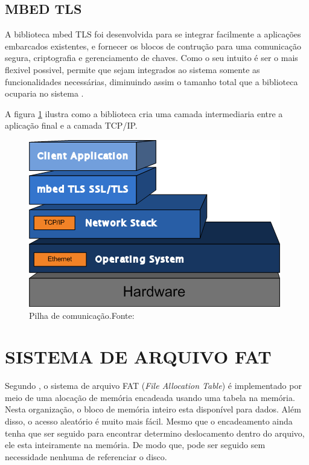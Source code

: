 \subsection{MBED TLS}
A biblioteca mbed TLS foi desenvolvida para se integrar facilmente a aplicações embarcados existentes, e fornecer os blocos de contrução para uma comunicação segura, criptografia e gerenciamento de chaves. Como o seu intuito é ser o mais flexivel possivel, permite que sejam integrados ao sistema somente as funcionalidades necessárias, diminuindo assim o tamanho total que a biblioteca ocuparia no sistema \cite{mbedtls}.

A figura \ref{mbedtlsFig} ilustra como a biblioteca cria uma camada intermediaria entre a aplicação final e a camada TCP/IP.

\begin{figure}[H]
    \scriptsize
     \centering
     \includegraphics[scale=1]{dados/figuras/mbedtls.png}
     \caption{Pilha de comunicação.\newline Fonte:\cite{mbedtls}}
     \label{mbedtlsFig}
\end{figure}



\section{SISTEMA DE ARQUIVO FAT}

Segundo , o sistema de arquivo FAT (\textit{File Allocation Table}) é implementado por meio de uma alocação de memória encadeada usando uma tabela na memória. Nesta organização, o bloco de memória inteiro esta disponível para dados. Além disso, o acesso aleatório é muito mais fácil. Mesmo que o encadeamento ainda tenha que ser seguido para encontrar determino deslocamento dentro do arquivo, ele esta inteiramente na memória. De modo que, pode ser seguido sem necessidade nenhuma de referenciar o disco.


